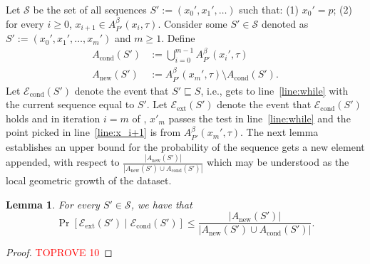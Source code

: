 \documentclass[11pt,letterpaper]{article}
\theoremstyle{plain}
\newtheorem{lemma}[theorem]{Lemma}
\theoremstyle{definition}
\theoremstyle{remark}
\newcommand{\Econd}{\ensuremath{\mathcal{E}_{\mathrm{cond}}}\xspace}
\newcommand{\Eextend}{\ensuremath{\mathcal{E}_{\mathrm{ext}}}\xspace}
\newcommand{\Acond}{\ensuremath{A_{\mathrm{cond}}}\xspace}
\newcommand{\Anew}{\ensuremath{A_{\mathrm{new}}}\xspace}
\begin{document}
        Let $\mathcal{S}$ be the set of all sequences $S':=(x_{0}', x_{1}', \ldots )$ such that: (1) $x_{0}' = p$; (2) for every $i\geq 0$, $x_{i+1}\in A_{P'}^{\beta}(x_{i}, \tau)$.  
        Consider some $S'\in \mathcal{S}$ denoted as $S' := (x_{0}', x_{1}', \ldots, x_{m}')$ and $m\geq 1$.  
        Define 
        \begin{align}
            \label{eqn:Acond_Anew}
            \Acond(S')&:= \bigcup_{i=0}^{m-1}A_{P'}^{\beta}(x_{i}', \tau)\nonumber\\ 
            \Anew(S')&:= A_{P'}^{\beta}(x_{m}', \tau)\setminus \Acond(S'). 
        \end{align} 
        Let $\Econd(S')$ denote the event that $S'\sqsubseteq S$, i.e.,  gets to line~\ref{line:while} with the current sequence equal to $S'$. 
        Let $\Eextend(S')$ denote the event that $\Econd(S')$ holds and in iteration $i=m$ of ,  $x'_{m}$ passes the test in line~\ref{line:while} and the point picked in line~\ref{line:x_i+1} is from $A_{P'}^{\beta}(x_{m}', \tau)$.  
        The next lemma establishes an upper bound for the probability of the sequence gets a new element appended,
        with respect to  $\frac{|\Anew(S')|}{|\Anew(S')\cup \Acond(S')|}$
        which may be understood as the local geometric growth of the dataset.  

        \begin{lemma}
            \label{lemma:ext_cond}
            For every $S'\in \mathcal{S}$, we have that 
            \begin{equation*}
                \label{eqn:formalized}
                \Pr[\Eextend(S')\mid \Econd(S')]\leq \frac{|\Anew(S')|}{|\Anew(S')\cup \Acond(S')|} .
            \end{equation*} 
        \end{lemma}
        \begin{proof}\textcolor{red}{TOPROVE 10}\end{proof}
\end{document}
